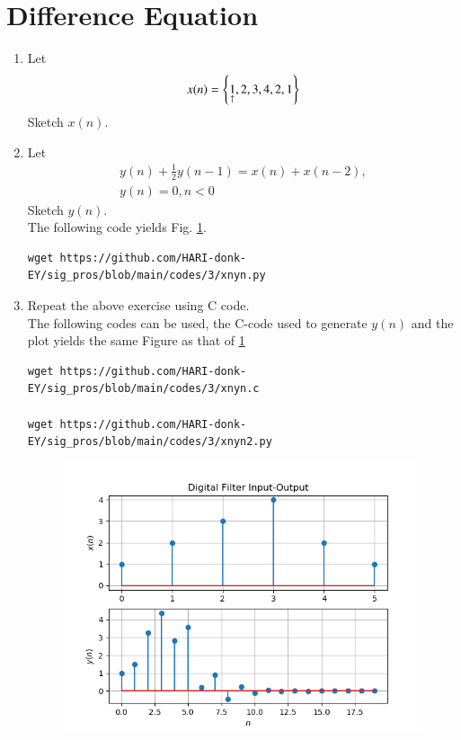 \documentclass[journal,12pt,twocolumn]{IEEEtran}
\renewcommand\thesection{\arabic{section}}
\begin{document}
\section{Difference Equation}
\begin{enumerate}[label=\thesection.\arabic*,ref=\thesection.\theenumi]


\item Let
\begin{equation}
x(n) = \left\{\underset{\uparrow}{1},2,3,4,2,1\right\}
\end{equation}
Sketch $x(n)$.\\


\item Let
\begin{multline}
\label{eq:iir_filter}
y(n) + \frac{1}{2}y(n-1) = x(n) + x(n-2), 
\\
 y(n) = 0, n < 0
\end{multline}
Sketch $y(n)$.
\\
\solution The following code yields Fig. \ref{fig:xnyn.png}.
\begin{lstlisting}
wget https://github.com/HARI-donk-EY/sig_pros/blob/main/codes/3/xnyn.py
\end{lstlisting}


\item Repeat the above exercise using C code.\\
\solution The following codes can be used, the C-code used to generate $y(n)$ and the plot yields the same  Figure as that of \ref{fig:xnyn.png}
\begin{lstlisting}
wget https://github.com/HARI-donk-EY/sig_pros/blob/main/codes/3/xnyn.c

wget https://github.com/HARI-donk-EY/sig_pros/blob/main/codes/3/xnyn2.py
\end{lstlisting}

\begin{figure}[!ht]
\begin{center}
\includegraphics[width=\columnwidth]{./figs/xnyn.png}
\end{center}
\label{fig:xnyn.png}	
\end{figure}

\end{enumerate}
\end{document}
